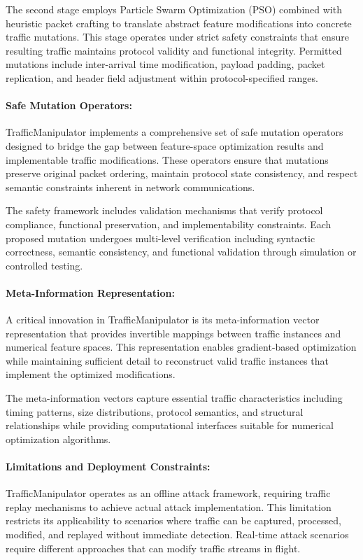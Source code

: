 The second stage employs Particle Swarm Optimization (PSO) combined with heuristic packet crafting to translate abstract feature modifications into concrete traffic mutations. This stage operates under strict safety constraints that ensure resulting traffic maintains protocol validity and functional integrity. Permitted mutations include inter-arrival time modification, payload padding, packet replication, and header field adjustment within protocol-specified ranges.

\paragraph{Safe Mutation Operators:}
TrafficManipulator implements a comprehensive set of safe mutation operators designed to bridge the gap between feature-space optimization results and implementable traffic modifications. These operators ensure that mutations preserve original packet ordering, maintain protocol state consistency, and respect semantic constraints inherent in network communications.

The safety framework includes validation mechanisms that verify protocol compliance, functional preservation, and implementability constraints. Each proposed mutation undergoes multi-level verification including syntactic correctness, semantic consistency, and functional validation through simulation or controlled testing.

\paragraph{Meta-Information Representation:}
A critical innovation in TrafficManipulator is its meta-information vector representation that provides invertible mappings between traffic instances and numerical feature spaces. This representation enables gradient-based optimization while maintaining sufficient detail to reconstruct valid traffic instances that implement the optimized modifications.

The meta-information vectors capture essential traffic characteristics including timing patterns, size distributions, protocol semantics, and structural relationships while providing computational interfaces suitable for numerical optimization algorithms.

\paragraph{Limitations and Deployment Constraints:}
TrafficManipulator operates as an offline attack framework, requiring traffic replay mechanisms to achieve actual attack implementation. This limitation restricts its applicability to scenarios where traffic can be captured, processed, modified, and replayed without immediate detection. Real-time attack scenarios require different approaches that can modify traffic streams in flight.


